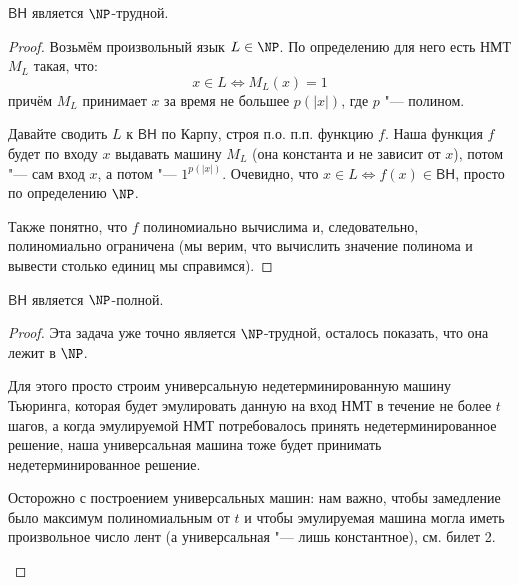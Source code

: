 	\begin{theorem}
		$\mathsf{BH}$ является $\NP$-трудной.
	\end{theorem}
	\begin{proof}
		Возьмём произвольный язык $L \in \NP$.
		По определению для него есть НМТ $M_L$ такая, что:
		\[ x \in L \iff M_L(x) = 1 \]
		причём $M_L$ принимает $x$ за время не большее $p(|x|)$, где $p$ "--- полином.

		Давайте сводить $L$ к $\mathsf{BH}$ по Карпу, строя п.о. п.п. функцию $f$.
		Наша функция $f$ будет по входу $x$ выдавать машину $M_L$ (она константа и не зависит от $x$),
		потом "--- сам вход $x$, а потом "--- $1^{p(|x|)}$.
		Очевидно, что $x \in L \iff f(x) \in \mathsf{BH}$, просто по определению $\NP$.

		Также понятно, что $f$ полиномиально вычислима и, следовательно, полиномиально ограничена
		(мы верим, что вычислить значение полинома и вывести столько единиц мы справимся).
	\end{proof}

	\begin{theorem}
		$\mathsf{BH}$ является $\NP$-полной.
	\end{theorem}
	\begin{proof}
		Эта задача уже точно является $\NP$-трудной, осталось показать, что она лежит в $\NP$.

		Для этого просто строим универсальную недетерминированную машину Тьюринга, которая будет эмулировать данную на вход НМТ
		в течение не более $t$ шагов, а когда эмулируемой НМТ потребовалось принять недетерминированное решение, наша универсальная машина тоже
		будет принимать недетерминированное решение.
		\begin{Rem}
			Осторожно с построением универсальных машин: нам важно, чтобы замедление было максимум полиномиальным от $t$ и чтобы эмулируемая машина
			могла иметь произвольное число лент (а универсальная "--- лишь константное), см. билет 2.
		\end{Rem}
	\end{proof}
